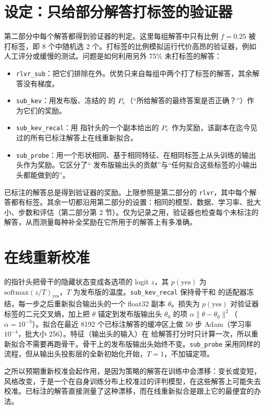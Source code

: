 
\section{设定：只给部分解答打标签的验证器}\label{sec:setting}

第二部分中每个解答都得到验证器的判定。这里每组解答中只有比例 $f=0.25$ 被打标签，即 8 个中随机选 2 个。打标签的比例模拟运行代价高昂的验证器，例如人工评分或缓慢的测试。问题是如何利用另外 75\% 未打标签的解答：
\begin{itemize}
\item \texttt{rlvr\_sub}：把它们排除在外。优势只来自每组中两个打了标签的解答，其余解答没有梯度。
\item \texttt{sub\_kev}：用发布版、冻结的 \kev{} 的 $P_{\mathrm{c}}$（“所给解答的最终答案是否正确？”）作为它们的奖励。
\item \texttt{sub\_kev\_recal}：用 \kev{} 指针头的一个副本给出的 $P_{\mathrm{c}}$ 作为奖励，该副本在迄今见过的所有已标注解答上在线重新拟合。
\item \texttt{sub\_probe}：用一个形状相同、基于相同特征、在相同标签上从头训练的输出头作为奖励。它区分了“\kev{} 发布版输出头的贡献”与“任何拟合这些标签的小输出头都能做到的”。
\end{itemize}
已标注的解答总是得到验证器的奖励。上限参照是第二部分的 \texttt{rlvr}，其中每个解答都有标签。其余一切都沿用第二部分的设置：相同的模型、数据、学习率、批大小、步数和评估（第二部分第 2 节）。仅为记录之用，验证器也检查每个未标注的解答，从而测量每种补全奖励在它所用于的解答上有多准确。

\section{在线重新校准}\label{sec:recal}

\kev{} 的指针头把骨干的隐藏状态变成各选项的 logit $z$，其 $p(\text{yes})$ 为 $\mathrm{softmax}(z/T)_{\text{yes}}$，$T$ 为发布版的温度。\texttt{sub\_kev\_recal} 保持骨干和 \kev{} 的适配器冻结，每一步之后重新拟合输出头的一个 float32 副本 $\theta$。损失为 $p(\text{yes})$ 对验证器标签的二元交叉熵，加上把 $\theta$ 锚定到发布版输出头 $\theta_0$ 的项 $\alpha\lVert\theta-\theta_0\rVert^2$（$\alpha=10^{-3}$）。拟合在最近 8192 个已标注解答的缓冲区上做 50 步 Adam（学习率 $10^{-4}$，批大小 256）。特征（输出头的输入）在 \kev{} 给解答打分时只计算一次，所以重新拟合不需要再跑骨干。骨干上的发布版输出头始终不变。\texttt{sub\_probe} 采用同样的流程，但从输出头投影层的全新初始化开始，$T=1$，不加锚定项。

之所以预期重新校准会起作用，是因为策略的解答在训练中会漂移：变长或变短，风格改变，于是一个在自身训练分布上校准过的评判模型，在这些解答上可能失去校准。已标注的解答直接测量了这种漂移，而在线重新拟合是跟上它的最便宜的办法。
